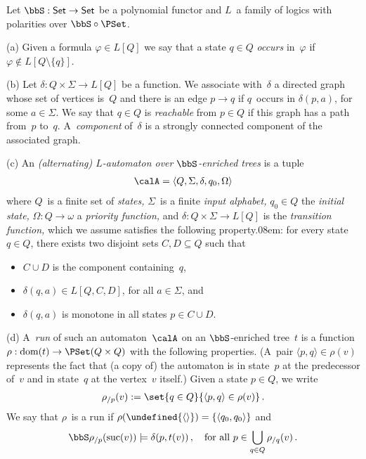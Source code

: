 \documentclass[10pt, fleqn]{scrartcl}
\makeatletter
\newcommand\m@thsm@ller[2]{\mbox{\relscale{0.91}$\m@th#1#2$}}
\let\smaller\undefined
\DeclareRobustCommand\smaller[1]{\relax\ifmmode{\mathpalette\m@thsm@ller{#1}}\else{\relscale{0.91}#1}\fi}
\DeclareRobustCommand*{\dom}{\qopname\relax o{dom}}
\newcommand*{\Set}{\mathsf{Set}}
\newcommand*{\suc}{\mathrm{suc}}
\newcommand*{\emptyseq}{\smaller{\langle\rangle}}
\newcommand*{\?}{\kern .08em}
\makeatother
\begin{document}
\begin{Def}\label{Def: automaton}
Let $\bbS : \Set \to \Set$ be a polynomial functor and $L$~a family of logics with polarities
over $\bbS \circ \PSet$.

(a) Given a formula $\varphi \in L[Q]$ we say that a state $q \in Q$ \emph{occurs}
in~$\varphi$ if $\varphi \notin L[Q \setminus \{q\}]$.

(b) Let $\delta : Q \times \Sigma \to L[Q]$ be a function.
We associate with~$\delta$ a directed graph whose set of vertices is~$Q$ and there is an
edge $p \to q$ if $q$~occurs in $\delta(p,a)$, for some $a \in \Sigma$.
We say that $q \in Q$ is \emph{reachable} from $p \in Q$ if this graph has a path from~$p$
to~$q$. A~\emph{component} of~$\delta$ is a strongly connected component of the associated graph.

(c)
An \emph{(alternating) $L$-automaton over\/ $\bbS$-enriched trees} is a tuple
\begin{align*}
  \calA = \langle Q,\Sigma,\delta,q_0,\Omega\rangle
\end{align*}
where $Q$~is a finite set of \emph{states,} $\Sigma$~is a finite \emph{input alphabet,}
$q_0 \in Q$ the \emph{initial state,} $\Omega : Q \to \omega$ a \emph{priority function,} and
$\delta : Q \times \Sigma \to L[Q]$ is the \emph{transition function,}
which we assume satisfies the following property\?:
for every state $q \in Q$, there exists two disjoint sets $C,D \subseteq Q$ such that
\begin{itemize}
\item $C \cup D$ is the component containing~$q$,
\item $\delta(q,a) \in L[Q,C,D]$, for all $a \in \Sigma$, and
\item $\delta(q,a)$ is monotone in all states $p \in C \cup D$.
\end{itemize}

(d)
A~\emph{run} of such an automaton~$\calA$ on an $\bbS$-enriched tree~$t$ is a function
$\rho : \dom(t) \to \PSet(Q \times Q)$ with the following properties.
(A~pair $\langle p,q\rangle \in \rho(v)$ represents the fact that (a copy of) the automaton
is in state~$p$ at the predecessor of~$v$ and in state~$q$ at the vertex~$v$ itself.)
Given a state $p \in Q$, we write
\begin{align*}
  \rho_{/p}(v) := \set{ q \in Q }{ \langle p,q\rangle \in \rho(v) }\,.
\end{align*}
We say that $\rho$~is a run if $\rho(\emptyseq) = \{\langle q_0,q_0\rangle\}$ and
\begin{align*}
  \bbS \rho_{/p}(\suc(v)) \models \delta(p,t(v))\,,
  \quad\text{for all }
    p \in \bigcup_{q \in Q} \rho_{/q}(v)\,.
\end{align*}


\end{Def}
\end{document}
